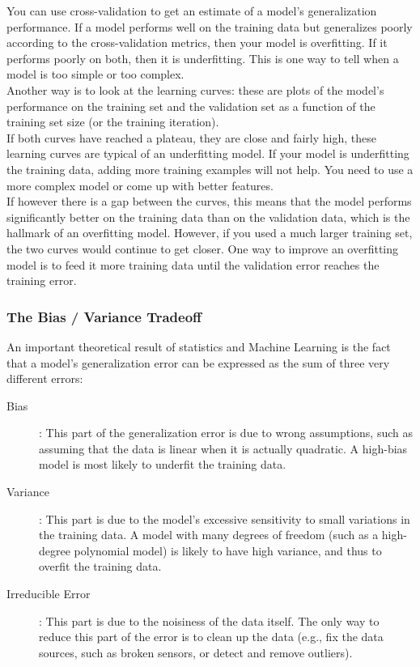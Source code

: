 \documentclass[french]{article}
\begin{document}
You can use cross-validation to get an estimate of a model’s generalization performance. If a model performs well on the training data but generalizes poorly according to the cross-validation metrics, then your model is overfitting. If it performs poorly on both, then it is underfitting. This is one way to tell when a model is too simple or too complex.\\

Another way is to look at the learning curves: these are plots of the model’s performance on the training set and the validation set as a function of the training set size (or the training iteration).\\

If both curves have reached a plateau, they are close and fairly high, these learning curves are typical of an underfitting model. If your model is underfitting the training data, adding more training examples will not help. You need to use a more complex model or come up with better features.\\

If however there is a gap between the curves, this means that the model performs significantly better on the training data than on the validation data, which is the hallmark of an overfitting model. However, if you used a much larger training set, the two curves would continue to get closer. One way to improve an overfitting model is to feed it more training data until the validation error reaches the training error.

\subsubsection{The Bias / Variance Tradeoff}

An important theoretical result of statistics and Machine Learning is the fact that a model’s generalization error can be expressed as the sum of three very different errors:

\begin{description}
    \item [Bias]: This part of the generalization error is due to wrong assumptions, such as assuming that the data is linear when it is actually quadratic. A high-bias model is most likely to underfit the training data.
    \item [Variance]: This part is due to the model’s excessive sensitivity to small variations in the training data. A model with many degrees of freedom (such as a high-degree polynomial model) is likely to have high variance, and thus to overfit the training data.
    \item [Irreducible Error]: This part is due to the noisiness of the data itself. The only way to reduce this part of the error is to clean up the data (e.g., fix the data sources, such as broken sensors, or detect and remove outliers).
\end{description}
\end{document}
